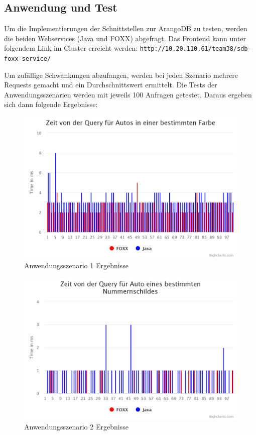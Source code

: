 \subsection{Anwendung und Test}
Um die Implementierungen der Schnittstellen zur ArangoDB zu testen, werden die beiden Webservices (Java und FOXX) abgefragt. Das Frontend kann unter folgendem Link im Cluster erreicht werden: \texttt{http://10.20.110.61/team38/sdb-foxx-service/}


Um zufällige Schwankungen abzufangen, werden bei jeden Szenario mehrere Requests gemacht und ein Durchschnittswert ermittelt. Die Tests der Anwendungsszenarien werden mit jeweils 100 Anfragen getestet. Daraus ergeben sich dann folgende Ergebnisse:


\begin{figure}[htbp] 
  	\centering
     \includegraphics[width=1\textwidth]{./images/8.UseCase1Diagramm.png}
 	\caption{Anwendungsszenario 1 Ergebnisse}
  \label{fig:DataSchema}
\end{figure}


\begin{figure}[htbp] 
  	\centering
     \includegraphics[width=1\textwidth]{./images/8.UseCase2Diagramm.png}
 	\caption{Anwendungsszenario 2 Ergebnisse}
  \label{fig:DataSchema}
\end{figure}


